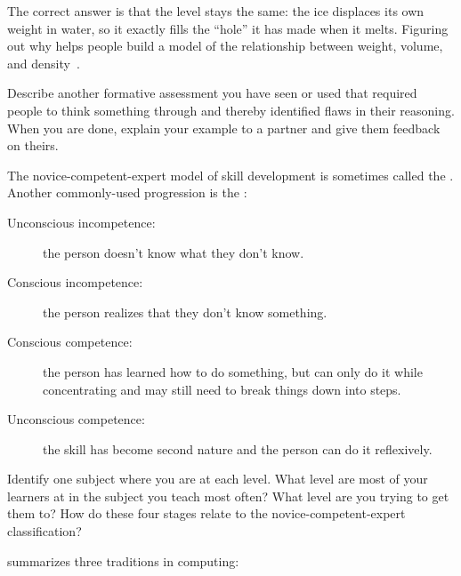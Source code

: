 
The correct answer is that the level stays the same:
the ice displaces its own weight in water,
so it exactly fills the ``hole'' it has made when it melts.
Figuring out why helps people build a model of the relationship between weight, volume, and density~\cite{Epst2002}.

Describe another formative assessment you have seen or used
that required people to think something through
and thereby identified flaws in their reasoning.
When you are done,
explain your example to a partner
and give them feedback on theirs.


The novice-competent-expert model of skill development
is sometimes called the .
Another commonly-used progression is
the :

\begin{description}

\item[Unconscious incompetence:]
  the person doesn't know what they don't know.

\item[Conscious incompetence:]
  the person realizes that they don't know something.

\item[Conscious competence:]
  the person has learned how to do something,
  but can only do it while concentrating
  and may still need to break things down into steps.

\item[Unconscious competence:]
  the skill has become second nature
  and the person can do it reflexively.

\end{description}

Identify one subject where you are at each level.
What level are most of your learners at in the subject you teach most often?
What level are you trying to get them to?
How do these four stages relate to the novice-competent-expert classification?


\cite{Tedr2008} summarizes three traditions in computing:

